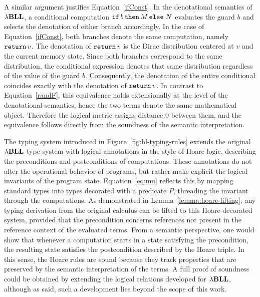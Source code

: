 A similar argument justifies Equation~\ref{ifConst}. In the denotational semantics of ${\lambda}\mathbf{BLL}$, a conditional computation $\mathtt{if}\,b\,\mathtt{then}\, M\,\mathtt{else}\; N$ evaluates the guard $b$ and selects the denotation of either branch accordingly. In the case of Equation~\ref{ifConst}, both branches denote the same computation, namely $\mathtt{return}\, v$. The denotation of $\mathtt{return}\, v$ is the Dirac distribution centered at $v$ and the current memory state. Since both branches correspond to the same distribution, the conditional expression denotes that same distribution regardless of the value of the guard $b$. Consequently, the denotation of the entire conditional coincides exactly with the denotation of $\mathtt{return}\, v$. In contrast to Equation~\ref{randF}, this equivalence holds extensionally at the level of the denotational semantics, hence the two terms denote the same mathematical object. Therefore the logical metric assigns distance $0$ between them, and the equivalence follows directly from the soundness of the semantic interpretation.

The typing system introduced in Figure~\ref{fig:hl-typing-rules} extends the original ${\lambda}\mathbf{BLL}$ type system with logical annotations in the style of Hoare logic, describing the preconditions and postconditions of computations. These annotations do not alter the operational behavior of programs, but rather make explicit the logical invariants of the program state. Equation~\ref{eq:mu} reflects this by mapping standard types into types decorated with a predicate $P$, threading the invariant through the computations. As demonstrated in Lemma~\ref{lemma:hoare-lifting}, any typing derivation from the original calculus can be lifted to this Hoare-decorated system, provided that the precondition concerns references not present in the reference context of the evaluated terms. From a semantic perspective, one would show that whenever a computation starts in a state satisfying the precondition, the resulting state satisfies the postcondition described by the Hoare triple. In this sense, the Hoare rules are sound because they track properties that are preserved by the semantic interpretation of the terms. A full proof of soundness could be obtained by extending the logical relations developed for ${\lambda}\mathbf{BLL}$, although as said, such a development lies beyond the scope of this work.